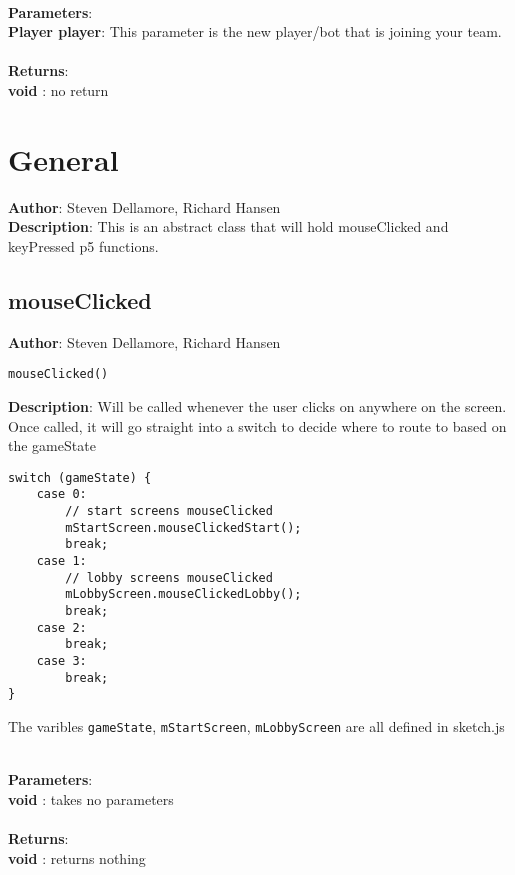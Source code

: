 \documentclass[12pt]{article}
\begin{document}
\textbf{\large{\\Parameters}}:\\
\textbf{Player player}: This parameter is the new player/bot that is joining your team.\\\textbf{\large{\\Returns}}:\\
\textbf{void }: no return\\

\section{General}
\textbf{Author}: Steven Dellamore, Richard Hansen \\
\textbf{Description}: This is an abstract class that will hold mouseClicked and keyPressed p5 functions. \\



\subsection{mouseClicked}
\textbf{Author}: Steven Dellamore, Richard Hansen 
\vspace*{1\baselineskip}
\begin{lstlisting}
mouseClicked()
\end{lstlisting} 
\vspace*{1\baselineskip}
\textbf{Description}: Will be called whenever the user clicks on anywhere on the screen. Once called, it will go straight into a switch to decide where to route to based on the gameState 
\begin{verbatim}
switch (gameState) {
    case 0:
        // start screens mouseClicked
        mStartScreen.mouseClickedStart(); 
        break;
    case 1:
        // lobby screens mouseClicked
        mLobbyScreen.mouseClickedLobby();
        break;
    case 2:
        break;
    case 3:
        break;
}
\end{verbatim}
 The varibles \texttt{gameState}, \texttt{mStartScreen}, \texttt{mLobbyScreen} are all defined in sketch.js 


\textbf{\large{\\Parameters}}:\\
\textbf{void }: takes no parameters\\\textbf{\large{\\Returns}}:\\
\textbf{void }: returns nothing\\
\end{document}
